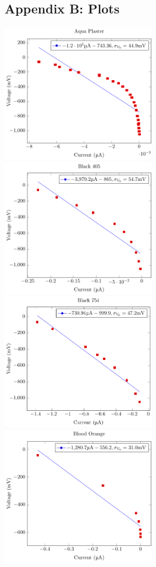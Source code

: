 \documentclass[a4paper]{article}
\begin{document}
\subsection{Appendix B: Plots}
\label{app:stoppingPotentialPlots}

\includegraphics[width=0.5\textwidth]{P1-PlanksConstant/Plots/AquaPlaster/aquaPlaster.pdf}
\includegraphics[width=0.5\textwidth]{P1-PlanksConstant/Plots/Black405/black405.pdf}
\includegraphics[width=0.5\textwidth]{P1-PlanksConstant/Plots/Black754/black754.pdf}
\includegraphics[width=0.5\textwidth]{P1-PlanksConstant/Plots/BloodOrange/bloodOrange.pdf}
\end{document}
